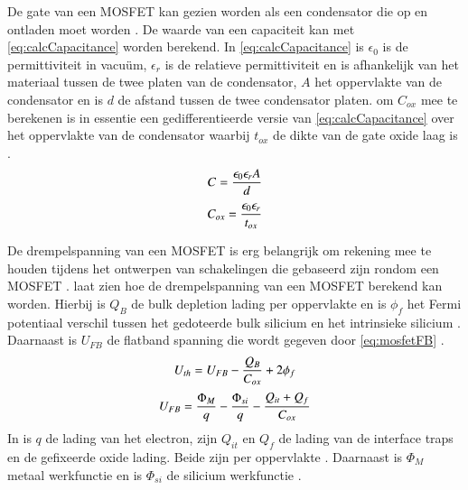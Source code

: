 De gate van een MOSFET kan gezien worden als een condensator die op en ontladen moet worden \cite{DonaldNeamenSemiconductorPhysicsAndDevicesBasicPrinciples}. De waarde van een capaciteit kan met \cref{eq:calcCapacitance} worden berekend. In \cref{eq:calcCapacitance} is $\epsilon_0$ is de permittiviteit in vacuüm, $\epsilon_r$ is de relatieve permittiviteit en is afhankelijk van het materiaal tussen de twee platen van de condensator, $A$ het oppervlakte van de condensator en is $d$ de afstand tussen de twee condensator platen.  om $C_{ox}$ mee te berekenen is in essentie een gedifferentieerde versie van \cref{eq:calcCapacitance} over het oppervlakte van de condensator waarbij $t_{ox}$ de dikte van de gate oxide laag is \cite{DonaldNeamenSemiconductorPhysicsAndDevicesBasicPrinciples}.
\begin{equation} \label{eq:calcCapacitance}
    C=\frac{\epsilon_0\epsilon_rA}{d}
    \tagaddtext{[\si{\farad}]}
\end{equation}
\begin{equation}\label{eq:calcCox}
    C_{ox}=\frac{\epsilon_0\epsilon_r}{t_{ox}}
    \tagaddtext{[\si{\farad\,\meter^{-2}}]}
\end{equation}

De drempelspanning van een MOSFET is erg belangrijk om rekening mee te houden tijdens het ontwerpen van schakelingen die gebaseerd zijn rondom een MOSFET \cite{inleidingInDeElektronicaWissenburgh,DonaldNeamenSemiconductorPhysicsAndDevicesBasicPrinciples,verhoeven2007structured}.  laat zien hoe de drempelspanning van een MOSFET berekend kan worden. Hierbij is $Q_B$ de bulk depletion lading per oppervlakte en is $\phi_f$ het Fermi potentiaal verschil tussen het gedoteerde bulk silicium en het intrinsieke silicium \cite{bergveld1985impactOfMosfetBasedSensors}. Daarnaast is $U_{FB}$ de flatband spanning die wordt gegeven door \cref{eq:mosfetFB} \cite{bergveld1985impactOfMosfetBasedSensors,isfetAsAnElectronicDevice,DonaldNeamenSemiconductorPhysicsAndDevicesBasicPrinciples,bergveld2003thirtyYearsISFET}.
\begin{equation} \label{eq:mosfetUth}
    U_{th}=U_{FB}-\frac{Q_B}{C_{ox}}+2\phi_f
    \tagaddtext{[\si{\volt}]}
\end{equation}
\begin{equation} \label{eq:mosfetFB}
    U_{FB}=\frac{\Phi_M}{q}-\frac{\Phi_{si}}{q}-\frac{Q_{it}+Q_f}{C_{ox}}
    \tagaddtext{[\si{\volt}]}
\end{equation}
In  is $q$ de lading van het electron, zijn $Q_{it}$ en $Q_f$ de lading van de interface traps en de gefixeerde oxide lading. Beide zijn per oppervlakte \cite{bergveld1985impactOfMosfetBasedSensors}. Daarnaast is $\Phi_M$ metaal werkfunctie en is $\Phi_{si}$ de silicium werkfunctie \cite{bergveld1985impactOfMosfetBasedSensors,bergveld2003thirtyYearsISFET}.

